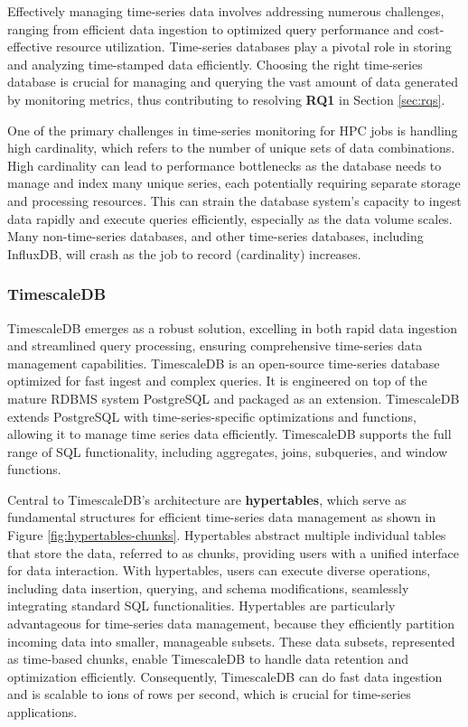 Effectively managing time-series data involves addressing numerous challenges, ranging from efficient data ingestion to optimized query performance and cost-effective resource utilization. Time-series databases play a pivotal role in storing and analyzing time-stamped data efficiently. Choosing the right time-series database is crucial for managing and querying the vast amount of data generated by monitoring metrics, thus contributing to resolving \textbf{RQ1} in Section \ref{sec:rqs}.

One of the primary challenges in time-series monitoring for HPC jobs is handling high cardinality, which refers to the number of unique sets of data combinations. High cardinality can lead to performance bottlenecks as the database needs to manage and index many unique series, each potentially requiring separate storage and processing resources. This can strain the database system's capacity to ingest data rapidly and execute queries efficiently, especially as the data volume scales. Many non-time-series databases, and other time-series databases, including InfluxDB, will crash as the job to record (cardinality) increases.

\subsubsection{TimescaleDB}

TimescaleDB \cite{timescaledb} emerges as a robust solution, excelling in both rapid data ingestion and streamlined query processing, ensuring comprehensive time-series data management capabilities. TimescaleDB is an open-source time-series database optimized for fast ingest and complex queries. It is engineered on top of the mature RDBMS system PostgreSQL and packaged as an extension. TimescaleDB extends PostgreSQL with time-series-specific optimizations and functions, allowing it to manage time series data efficiently. TimescaleDB supports the full range of SQL functionality, including aggregates, joins, subqueries, and window functions.

Central to TimescaleDB's architecture are \textbf{hypertables}, which serve as fundamental structures for efficient time-series data management as shown in Figure \ref{fig:hypertables-chunks}. Hypertables abstract multiple individual tables that store the data, referred to as chunks, providing users with a unified interface for data interaction. With hypertables, users can execute diverse operations, including data insertion, querying, and schema modifications, seamlessly integrating standard SQL functionalities. Hypertables are particularly advantageous for time-series data management, because they efficiently partition incoming data into smaller, manageable subsets. These data subsets, represented as time-based chunks, enable TimescaleDB to handle data retention and optimization efficiently. Consequently, TimescaleDB can do fast data ingestion and is scalable to ions of rows per second, which is crucial for time-series applications.

